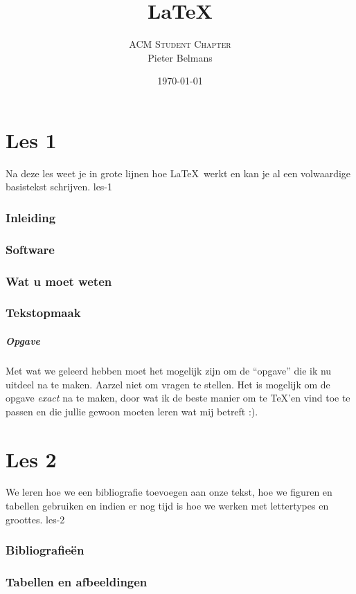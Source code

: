 \documentclass{beamer}
\title{\LaTeX}
\date{\today}
\author{\textsc{ACM Student Chapter} \\ Pieter Belmans}
\begin{document}
\begin{frame}
  \titlepage
\end{frame}

\part{Les 1}
\lecture
{Na deze les weet je in grote lijnen hoe \LaTeX\ werkt en kan je al een volwaardige basistekst schrijven.}
{les-1}
\section{Inleiding}

\section{Software}

\section{Wat u moet weten}

\section{Tekstopmaak}


\begin{frame}
  \frametitle{Opgave}

  Met wat we geleerd hebben moet het mogelijk zijn om de ``opgave'' die ik nu uitdeel na te maken. Aarzel niet om vragen te stellen. Het is mogelijk om de opgave \emph{exact} na te maken, door wat ik de beste manier om te \TeX'en vind toe te passen en die jullie gewoon moeten leren wat mij betreft :).
\end{frame}


\part{Les 2}
\lecture
{We leren hoe we een bibliografie toevoegen aan onze tekst, hoe we figuren en tabellen gebruiken en indien er nog tijd is hoe we werken met lettertypes en groottes.}
{les-2}
\section{Bibliografie\"en}

\section{Tabellen en afbeeldingen}

\end{document}
